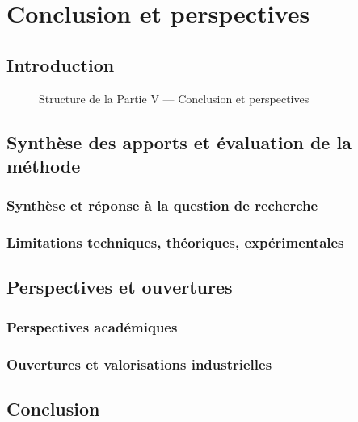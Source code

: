 
\cleardoublepage
{}
\part{Conclusion et perspectives}

\chapter*{Introduction}

\begin{figure}[h!]
    \centering
    \resizebox{\linewidth}{!}{%
        
    }
    \caption{Structure de la Partie V — Conclusion et perspectives}
\end{figure}

\chapter{Synthèse des apports et évaluation de la méthode}

\section{Synthèse et réponse à la question de recherche}

\section{Limitations techniques, théoriques, expérimentales}

\chapter{Perspectives et ouvertures}
\section{Perspectives académiques}
\section{Ouvertures et valorisations industrielles}

\chapter*{Conclusion}

